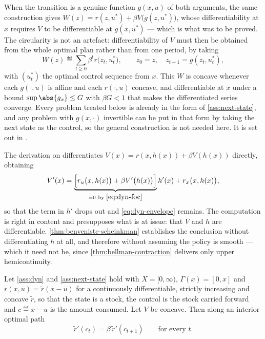 \begin{remark}\label{rem:general-transition}
	When the transition is a genuine function $g(x,u)$ of both arguments, the same
	construction gives
	$W(z)=r(z,u^{\ast})+\beta V\bigl(g(z,u^{\ast})\bigr)$, whose differentiability
	at $x$ requires $V$ to be differentiable at $g(x,u^{\ast})$ --- which is what
	was to be proved. The circularity is not an artefact: differentiability of $V$
	must then be obtained from the whole optimal plan rather than from one period,
	by taking
	\[
		W(z)\eqdef\sum_{t\geq0}\beta^{t}r\bigl(z_t,u^{\ast}_t\bigr),
		\qquad z_0=z,\quad z_{t+1}=g(z_t,u^{\ast}_t),
	\]
	with $(u^{\ast}_t)$ the optimal control sequence from $x$. This $W$ is concave
	whenever each $g(\cdot,u)$ is affine and each $r(\cdot,u)$ concave, and
	differentiable at $x$ under a bound $\sup\abs{g_x}\leq G$ with $\beta G<1$ that
	makes the differentiated series converge. Every problem treated below is
	already in the form of \autoref{ass:next-state}, and any problem with
	$g(x,\cdot)$ invertible can be put in that form by taking the next state as the
	control, so the general construction is not needed here. It is set out in
	\textcite[Sec.~4.3]{stokey1989recursive}.
\end{remark}

\begin{remark}\label{rem:envelope-direct}
	The derivation on \autocite[slide 18]{fukuda2026dynamic} differentiates
	$V(x)=r(x,h(x))+\beta V(h(x))$ directly, obtaining
	\[
		V'(x)=\underbrace{\Bigl[r_u\bigl(x,h(x)\bigr)+\beta V'\bigl(h(x)\bigr)\Bigr]}_{=0\ \text{by }\eqref{eq:dyn-foc}}h'(x)
		+r_x\bigl(x,h(x)\bigr),
	\]
	so that the term in $h'$ drops out and \eqref{eq:dyn-envelope} remains. The
	computation is right in content and presupposes what is at issue: that $V$ and
	$h$ are differentiable. \autoref{thm:benveniste-scheinkman} establishes the
	conclusion without differentiating $h$ at all, and therefore without assuming
	the policy is smooth --- which it need not be, since
	\autoref{thm:bellman-contraction} delivers only upper hemicontinuity.
\end{remark}

\begin{corollary}\label{cor:euler}
	Let \autoref{ass:dyn} and \autoref{ass:next-state} hold with
	$X=[0,\infty)$, $\Gamma(x)=[0,x]$ and $r(x,u)=\tilde r(x-u)$ for a
	continuously differentiable, strictly increasing and concave $\tilde r$, so
	that the state is a stock, the control is the stock carried forward and
	$c\eqdef x-u$ is the amount consumed. Let $V$ be concave. Then along an
	interior optimal path
	\begin{equation}\label{eq:euler-dyn}
		\tilde r'(c_t)=\beta\,\tilde r'(c_{t+1})\qquad\text{for every }t .
	\end{equation}
\end{corollary}

